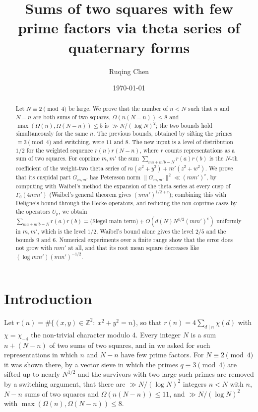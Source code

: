 \documentclass[11pt]{amsart}
\title[Sums of two squares with few prime factors]{Sums of two squares with few prime factors via theta series of quaternary forms}
\author{Ruqing Chen}
\date{\today}
\theoremstyle{remark}
\newcommand{\Z}{\mathbb{Z}}
\newcommand{\e}{\varepsilon}
\begin{document}
\begin{abstract}
Let $N\equiv 2\pmod 4$ be large. We prove that the number of $n<N$ such that $n$ and $N-n$ are both sums of two squares, $\Omega(n(N-n))\le 8$ and $\max(\Omega(n),\Omega(N-n))\le 5$ is $\gg N/(\log N)^2$; the two bounds hold simultaneously for the same $n$. The previous bounds, obtained by sifting the primes $\equiv 3\pmod 4$ and switching, were $11$ and $8$. The new input is a level of distribution $1/2$ for the weighted sequence $r(n)r(N-n)$, where $r$ counts representations as a sum of two squares. For coprime $m,m'$ the sum $\sum_{ma+m'b=N}r(a)r(b)$ is the $N$-th coefficient of the weight-two theta series of $m(x^2+y^2)+m'(z^2+w^2)$. We prove that its cuspidal part $G_{m,m'}$ has Petersson norm $\|G_{m,m'}\|^2\ll(mm')^{\e}$, by computing with Waibel's method the expansion of the theta series at every cusp of $\Gamma_0(4mm')$ (Waibel's general theorem gives $(mm')^{1/2+\e}$); combining this with Deligne's bound through the Hecke operators, and reducing the non-coprime cases by the operators $U_p$, we obtain $\sum_{ma+m'b=N}r(a)r(b)=\text{(Siegel main term)}+O(d(N)N^{1/2}(mm')^{\e})$ uniformly in $m,m'$, which is the level $1/2$. Waibel's bound alone gives the level $2/5$ and the bounds $9$ and $6$. Numerical experiments over a finite range show that the error does not grow with $mm'$ at all, and that its root mean square decreases like $(\log mm')(mm')^{-1/2}$.
\end{abstract}

\maketitle

\section{Introduction}\label{sec:intro}

Let $r(n)=\#\{(x,y)\in\Z^2:\ x^2+y^2=n\}$, so that $r(n)=4\sum_{d\mid n}\chi(d)$ with $\chi=\chi_{-4}$ the non-trivial character modulo $4$. Every integer $N$ is a sum $n+(N-n)$ of two sums of two squares, and in \cite{Chen2} we asked for such representations in which $n$ and $N-n$ have few prime factors. For $N\equiv2\pmod4$ it was shown there, by a vector sieve in which the primes $q\equiv3\pmod4$ are sifted up to nearly $N^{1/2}$ and the survivors with two large such primes are removed by a switching argument, that there are $\gg N/(\log N)^2$ integers $n<N$ with $n$, $N-n$ sums of two squares and $\Omega(n(N-n))\le 11$, and $\gg N/(\log N)^2$ with $\max(\Omega(n),\Omega(N-n))\le 8$.
\end{document}
